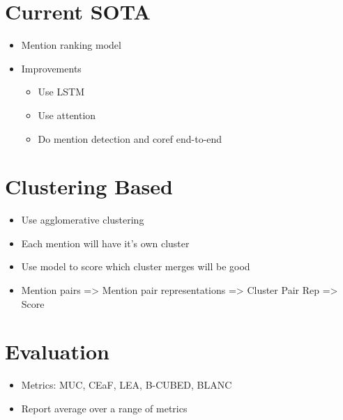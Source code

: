 \documentclass[a4paper]{article}
\begin{document}
\section{Current SOTA}
\begin{itemize}
    \item Mention ranking model
    \item Improvements
    \begin{itemize}
        \item Use LSTM
        \item Use attention
        \item Do mention detection and coref end-to-end
    \end{itemize}
\end{itemize}
\section{Clustering Based}
\begin{itemize}
    \item Use agglomerative clustering
    \item Each mention will have it's own cluster
    \item Use model to score which cluster merges will be good
    \item Mention pairs => Mention pair representations => Cluster Pair Rep => Score
\end{itemize}
\section{Evaluation}
\begin{itemize}
    \item Metrics: MUC, CEaF, LEA, B-CUBED, BLANC
    \item Report average over a range of metrics
\end{itemize}
\end{document}
